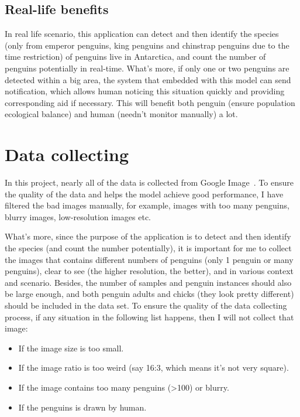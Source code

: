 \documentclass[runningheads]{llncs}
\begin{document}
\subsection{Real-life benefits}
In real life scenario, this application can detect and then identify the species (only from emperor penguins, king penguins and chinstrap penguins due to the time restriction) of penguins live in Antarctica, and count the number of penguins potentially in real-time. What's more, if only one or two penguins are detected within a big area, the system that embedded with this model can send notification, which allows human noticing this situation quickly and providing corresponding aid if necessary. This will benefit both penguin (ensure population ecological balance) and human (needn't monitor manually) a lot.


\section{Data collecting}
In this project, nearly all of the data is collected from Google Image~\cite{ref_google_image}. To ensure the quality of the data and helps the model achieve good performance, I have filtered the bad images manually, for example, images with too many penguins, blurry images, low-resolution images etc.

What's more, since the purpose of the application is to detect and then identify the species (and count the number potentially), it is important for me to collect the images that contains different numbers of penguins (only 1 penguin or many penguins), clear to see (the higher resolution, the better), and in various context and scenario. Besides, the number of samples and penguin instances should also be large enough, and both penguin adults and chicks (they look pretty different) should be included in the data set. To ensure the quality of the data collecting process, if any situation in the following list happens, then I will not collect that image:

\begin{itemize}
  \item If the image size is too small.
  \item If the image ratio is too weird (say 16:3, which means it's not very square).
  \item If the image contains too many penguins (\textgreater{100}) or blurry.
  \item If the penguins is drawn by human.
\end{itemize}
\end{document}
